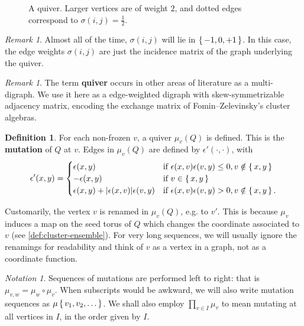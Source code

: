 \documentclass{amsart}
\theoremstyle{plain}
\theoremstyle{definition}
\newtheorem{definition}[theorem]{Definition}
\theoremstyle{remark}
\newtheorem{notation}[theorem]{Notation}
\newtheorem{remark}[theorem]{Remark}
\newcommand{\defined}[1]{\textbf{#1}}
\begin{document}
  \begin{figure}[h]
    \centering 

    \caption{A quiver. Larger vertices are of weight $2$, and dotted
      edges correspond to $\sigma(i,j) = \frac{1}{2}$.
      \label{fig:QC2}
    }
  \end{figure}

  \begin{remark}
    Almost all of the time, $\sigma(i,j)$ will lie in $\set{-1,0,+1}$.
    In this case, the edge weights $\sigma(i,j)$ are just the incidence
    matrix of the graph underlying the quiver.
  \end{remark}

  \begin{remark}
    The term \defined{quiver} occurs in other areas of literature as a
    multi-digraph. We use it here as a edge-weighted digraph with
    skew-symmetrizable adjacency matrix, encoding the exchange matrix of
    Fomin--Zelevinsky's cluster algebras.
  \end{remark}

  \begin{definition}
    For each non-frozen $v$, a quiver $\mu_{v}(Q)$ is defined. This is
    the \defined{mutation} of $Q$ at $v$. Edges in $\mu_{v}(Q)$ are
    defined by $\epsilon'(\cdot, \cdot)$, with \[ \epsilon'(x,y) =
      \begin{cases} \epsilon(x,y) & \text{if } \epsilon(x,v)
        \epsilon(v,y) \le 0, v \notin \set{x,y} \\ -\epsilon(x,y) &
        \text{if } v \in \set{x,y} \\ \epsilon(x,y) + |\epsilon(x,v)|
        \epsilon(v,y) & \text{if } \epsilon(x,v) \epsilon(v,y) > 0, v
        \notin \set{x,y}. \end{cases} \]
  \end{definition}

  Customarily, the vertex $v$ is renamed in $\mu_v(Q)$, e.g. to $v'$.
  This is because $\mu_v$ induces a map on the seed torus of $Q$ which
  changes the coordinate associated to $v$ (see
  \cref{def:cluster-ensemble}). For very long sequences, we will usually
  ignore the renamings for readability and think of $v$ as a vertex in a
  graph, not as a coordinate function.

  \begin{notation}
    \label{not:writing-mutations}
    Sequences of mutations are performed left to right: that is
    $\mu_{v,w} = \mu_{w} \circ \mu_{v}$. When subscripts would be
    awkward, we will also write mutation sequences as $\mu\set{v_1, v_2,
      \dotsc}$. We shall also employ $\prod_{v \in I} \mu_{v}$ to mean
    mutating at all vertices in $I$, in the order given by $I$.
  \end{notation}
\end{document}
